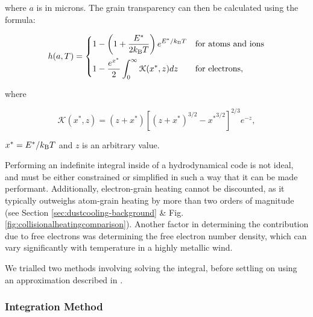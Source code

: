 \noindent
where $a$ is in microns.
The grain transparency can then be calculated using the formula:

\begin{equation}
  \label{eq:heintegral}
  h(a,T) =
  \begin{dcases}
    1 - \left(1 + \frac{E^*}{2k_\text{B} T}\right) e^{E^*/k_\text{B}T} & \text{for atoms and ions}\\
    1 - \frac{e^{x^*}}{2} \int^\infty_0 \mathcal{K}(x^*,z) dz & \text{for electrons} , 
  \end{dcases}
\end{equation}

\noindent
where

\begin{equation}
  \mathcal{K}(x^*,z) = (z + x^*) \left[ (z + x^*)^{3/2} - {x^*}^{3/2} \right]^{2/3} e^{-z} , 
\end{equation}

\noindent
$x^* = E^* / k_\text{B} T$ and $z$ is an arbitrary value.

Performing an indefinite integral inside of a hydrodynamical code is not ideal, and must be either constrained or simplified in such a way that it can be made performant.
Additionally, electron-grain heating cannot be discounted, as it typically outweighs atom-grain heating by more than two orders of magnitude (see Section \ref{sec:dustcooling-background} \& Fig. \ref{fig:collisionalheatingcomparison}).
Another factor in determining the contribution due to free electrons was determining the free electron number density, which can vary significantly with temperature in a highly metallic wind.

We trialled two methods involving solving the integral, before settling on using an approximation described in \textcite{dwek_infrared_1981}.

\subsubsection{Integration Method}

